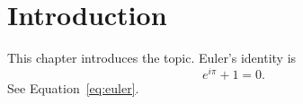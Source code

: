 \section{Introduction}\label{sec:intro}
This chapter introduces the topic. Euler's identity is
\begin{equation}\label{eq:euler}
e^{i\pi} + 1 = 0.
\end{equation}
See Equation~\eqref{eq:euler}.
